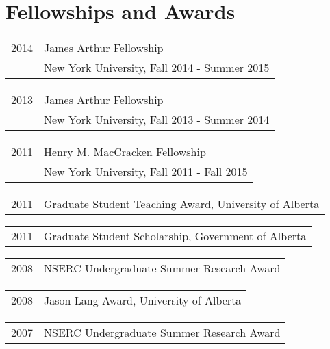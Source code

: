 \documentclass[letterpaper]{article}
\renewenvironment{itemize}{
  \begin{list}{}{
    \setlength{\leftmargin}{1.5em}
  }
}{
  \end{list}
}
\begin{document}
\section*{Fellowships and Awards}
\begin{itemize}
\item \begin{tabular}{ll}
2014 & James Arthur Fellowship \\
& New York University, Fall 2014 - Summer 2015 \\
\end{tabular}

\item \begin{tabular}{ll}
2013 & James Arthur Fellowship \\
& New York University, Fall 2013 - Summer 2014 \\
\end{tabular}

\item \begin{tabular}{ll}
2011 & Henry M. MacCracken Fellowship \\
& New York University, Fall 2011 - Fall 2015 \\
\end{tabular}

\item \begin{tabular}{ll}
2011 & Graduate Student Teaching Award, University of Alberta \\
\end{tabular}

\item \begin{tabular}{ll}
2011 & Graduate Student Scholarship, Government of Alberta \\
\end{tabular}

\item \begin{tabular}{ll}
2008 & NSERC Undergraduate Summer Research Award
\end{tabular}

\item \begin{tabular}{ll}
2008 & Jason Lang Award, University of Alberta
\end{tabular}

\item \begin{tabular}{ll}
2007 & NSERC Undergraduate Summer Research Award
\end{tabular}


\end{itemize}
\end{document}
